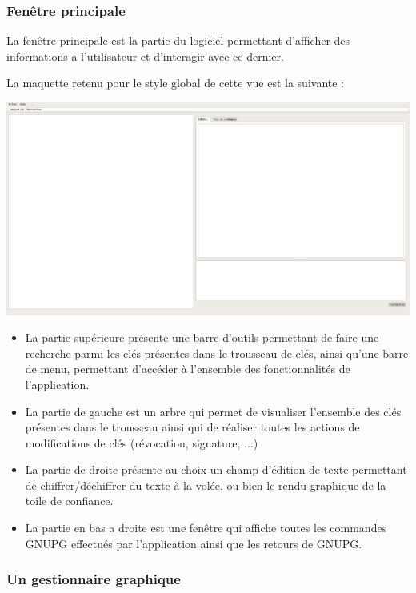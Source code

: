 \documentclass{../res/univ-projet}
\begin{document}
    \subsubsection{Fenêtre principale}

      La fenêtre principale est la partie du logiciel permettant d'afficher
      des informations a l'utilisateur et d'interagir avec ce dernier.

      La maquette retenu pour le style global de cette vue est la suivante :
      \begin{center}
        \includegraphics[scale=.25]{../res/maquette.png}
      \end{center}

      \begin{itemize}
        \item La partie supérieure présente une barre d'outils permettant de faire une recherche parmi les 
      clés présentes dans le trousseau de clés, ainsi qu'une barre de menu, permettant d'accéder à l'ensemble
      des fonctionnalités de l'application.
        \item La partie de gauche est un arbre qui permet de visualiser l'ensemble des clés présentes
        dans le trousseau ainsi qui de réaliser toutes les actions de modifications de clés (révocation, signature, ...)
        \item La partie de droite présente au choix un champ d'édition de texte permettant de chiffrer/déchiffrer
        du texte à la volée, ou bien le rendu graphique de la toile de confiance.
        \item La partie en bas a droite est une fenêtre qui affiche toutes les commandes GNUPG effectués
        par l'application ainsi que les retours de GNUPG.
      \end{itemize}

    \subsubsection{Un gestionnaire graphique}
\end{document}
